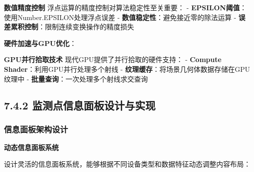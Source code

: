 \textbf{数值精度控制} 浮点运算的精度控制对算法稳定性至关重要： - \textbf{EPSILON阈值}：使用Number.EPSILON处理浮点误差 - \textbf{数值稳定性}：避免接近零的除法运算 - \textbf{误差累积控制}：限制连续变换操作的精度损失

\textbf{硬件加速与GPU优化}：

\textbf{GPU并行拾取技术} 现代GPU提供了并行拾取的硬件支持： - \textbf{Compute Shader}：利用GPU并行处理多个射线 - \textbf{纹理缓存}：将场景几何体数据存储在GPU纹理中 - \textbf{批量查询}：一次处理多个射线求交查询

\subsection{7.4.2 监测点信息面板设计与实现}\label{ux76d1ux6d4bux70b9ux4fe1ux606fux9762ux677fux8bbeux8ba1ux4e0eux5b9eux73b0}

\subsubsection{信息面板架构设计}\label{ux4fe1ux606fux9762ux677fux67b6ux6784ux8bbeux8ba1}

\textbf{动态信息面板系统}

设计灵活的信息面板系统，能够根据不同设备类型和数据特征动态调整内容布局：

